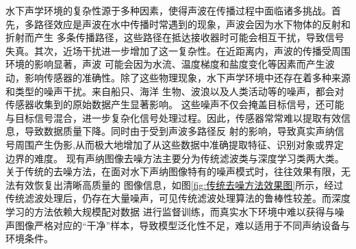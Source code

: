 水下声学环境的复杂性源于多种因素，使得声波在传播过程中面临诸多挑战。首先，多路径效应是声波在水中传播时常遇到的现象，声波会因为水下物体的反射和折射而产生
多条传播路径，这些路径在抵达接收器时可能会相互干扰，导致信号失真。其次，近场干扰进一步增加了这一复杂性。在近距离内，声波的传播受周围环境的影响显著，声波
可能会因为水流、温度梯度和盐度变化等因素而产生波动，影响传感器的准确性。除了这些物理现象，水下声学环境中还存在着多种来源和类型的噪声干扰。来自船只、海洋
生物、波浪以及人类活动等的噪声，都会对传感器收集到的原始数据产生显著影响。
这些噪声不仅会掩盖目标信号，还可能与目标信号混合，进一步复杂化信号处理过程。因此，传感器常常难以提取有效信息，导致数据质量下降。同时由于受到声波多路径反
射的影响，导致真实声纳信号周围产生伪影\cite{cervenka2002sidescan},从而极大地增加了从这些数据中准确提取特征、识别对象或界定边界的难度。
现有声纳图像去噪方法主要分为传统滤波类与深度学习类两大类。关于传统的去噪方法，在面对水下声纳图像特有的噪声模式时，往往效果有限，无法有效恢复出清晰高质量的
图像信息，如图\ref{fig:传统去噪方法效果图}所示，经过传统滤波处理后，仍存在大量噪声，可见传统滤波处理算法的鲁棒性较差。而深度学习的方法依赖大规模配对数据
进行监督训练，而真实水下环境中难以获得与噪声图像严格对应的“干净”样本，导致模型泛化性不足，难以适用于不同声纳设备与环境条件。


